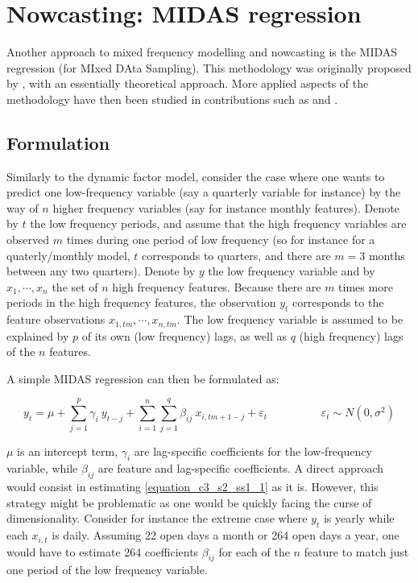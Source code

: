 \section{Nowcasting: MIDAS regression}
\label{chapter3_section2}


Another approach to mixed frequency modelling and nowcasting is the MIDAS regression (for MIxed DAta Sampling). This methodology was originally proposed by \cite{Ghysels2004}, with an essentially theoretical approach. More applied aspects of the methodology have then been studied in contributions such as \cite{Ghysels2007} and \cite{Ghysels2009}.


\subsection{Formulation}
\label{chapter3_section2_subsection1}

Similarly to the dynamic factor model, consider the case where one wants to predict one low-frequency variable (say a quarterly variable for instance) by the way of $n$ higher frequency variables (say for instance monthly features). Denote by $t$ the low frequency periods, and assume that the high frequency variables are observed $m$ times during one period of low frequency (so for instance for a quaterly/monthly model, $t$ corresponds to quarters, and there are $m=3$ months between any two quarters). Denote by $y$ the low frequency variable and by $x_{1}, \cdots, x_{n}$ the set of $n$ high frequency features. Because there are $m$ times more periods in the high frequency features, the observation $y_t$ corresponds to the feature observations $x_{1,tm}, \cdots, x_{n,tm}$. The low frequency variable is assumed to be explained by $p$ of its own (low frequency) lags, as well as $q$ (high frequency) lags of the $n$ features.

A simple MIDAS regression can then be formulated as:

\begin{equation}
y_t = \mu + \sum_{j=1}^{p} \gamma_i \ y_{t-j} + \sum_{i=1}^{n} \sum_{j=1}^{q} \beta_{ij} \  x_{i,tm+1-j} + \varepsilon_t \hspace{2cm}
\varepsilon_t \sim N(0, \sigma^2)
\label{equation_c3_s2_ss1_1}
\end{equation}

$\mu$ is an intercept term, $\gamma_i$ are lag-specific coefficients for the low-frequency variable, while $\beta_{ij}$ are feature and lag-specific coefficients. A direct approach would consist in estimating \ref{equation_c3_s2_ss1_1} as it is. However, this strategy might be problematic as one would be quickly facing the curse of dimensionality. Consider for instance the extreme case where $y_t$ is yearly while each $x_{i,t}$ is daily. Assuming 22 open days a month or 264 open days a year, one would have to estimate 264 coefficients $\beta_{ij}$ for each of the $n$ feature to match just one period of the low frequency variable.


